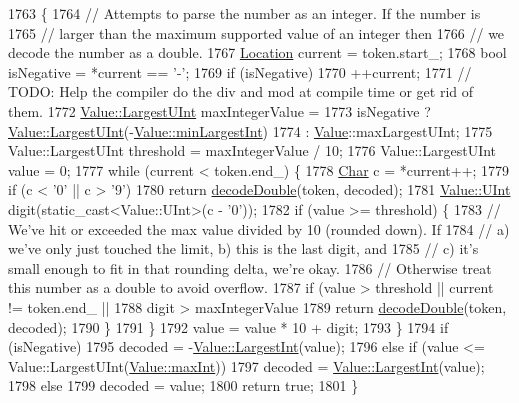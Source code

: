 \begin{DoxyCode}
1763                                                          \{
1764   \textcolor{comment}{// Attempts to parse the number as an integer. If the number is}
1765   \textcolor{comment}{// larger than the maximum supported value of an integer then}
1766   \textcolor{comment}{// we decode the number as a double.}
1767   \hyperlink{class_json_1_1_our_reader_a1bdc7bbc52ba87cae6b19746f2ee0189}{Location} current = token.start\_;
1768   \textcolor{keywordtype}{bool} isNegative = *current == \textcolor{charliteral}{'-'};
1769   \textcolor{keywordflow}{if} (isNegative)
1770     ++current;
1771   \textcolor{comment}{// TODO: Help the compiler do the div and mod at compile time or get rid of them.}
1772   \hyperlink{class_json_1_1_value_a6682a3684d635e03fc06ba229fa24eec}{Value::LargestUInt} maxIntegerValue =
1773       isNegative ? \hyperlink{class_json_1_1_value_a6682a3684d635e03fc06ba229fa24eec}{Value::LargestUInt}(-\hyperlink{class_json_1_1_value_af91df130daa50dd43d2cd89e6ee67706}{Value::minLargestInt})
1774                  : \hyperlink{class_json_1_1_value}{Value}::maxLargestUInt;
1775   Value::LargestUInt threshold = maxIntegerValue / 10;
1776   Value::LargestUInt value = 0;
1777   \textcolor{keywordflow}{while} (current < token.end\_) \{
1778     \hyperlink{class_json_1_1_our_reader_a0cd0bab4caa66594ab843ccd5f9dc239}{Char} c = *current++;
1779     \textcolor{keywordflow}{if} (c < '0' || c > \textcolor{charliteral}{'9'})
1780       \textcolor{keywordflow}{return} \hyperlink{class_json_1_1_our_reader_a1d1c3b44f6720a0e7c39b5ae8de3981c}{decodeDouble}(token, decoded);
1781     \hyperlink{class_json_1_1_value_a0933d59b45793ae4aade1757c322a98d}{Value::UInt} digit(static\_cast<Value::UInt>(c - \textcolor{charliteral}{'0'}));
1782     \textcolor{keywordflow}{if} (value >= threshold) \{
1783       \textcolor{comment}{// We've hit or exceeded the max value divided by 10 (rounded down). If}
1784       \textcolor{comment}{// a) we've only just touched the limit, b) this is the last digit, and}
1785       \textcolor{comment}{// c) it's small enough to fit in that rounding delta, we're okay.}
1786       \textcolor{comment}{// Otherwise treat this number as a double to avoid overflow.}
1787       \textcolor{keywordflow}{if} (value > threshold || current != token.end\_ ||
1788           digit > maxIntegerValue %
1789         \textcolor{keywordflow}{return} \hyperlink{class_json_1_1_our_reader_a1d1c3b44f6720a0e7c39b5ae8de3981c}{decodeDouble}(token, decoded);
1790       \}
1791     \}
1792     value = value * 10 + digit;
1793   \}
1794   \textcolor{keywordflow}{if} (isNegative)
1795     decoded = -\hyperlink{class_json_1_1_value_a1cbb82642ed05109b9833e49f042ece7}{Value::LargestInt}(value);
1796   \textcolor{keywordflow}{else} \textcolor{keywordflow}{if} (value <= Value::LargestUInt(\hyperlink{class_json_1_1_value_a978c799a8af3114ef7dab6fd0a310a1b}{Value::maxInt}))
1797     decoded = \hyperlink{class_json_1_1_value_a1cbb82642ed05109b9833e49f042ece7}{Value::LargestInt}(value);
1798   \textcolor{keywordflow}{else}
1799     decoded = value;
1800   \textcolor{keywordflow}{return} \textcolor{keyword}{true};
1801 \}
\end{DoxyCode}
